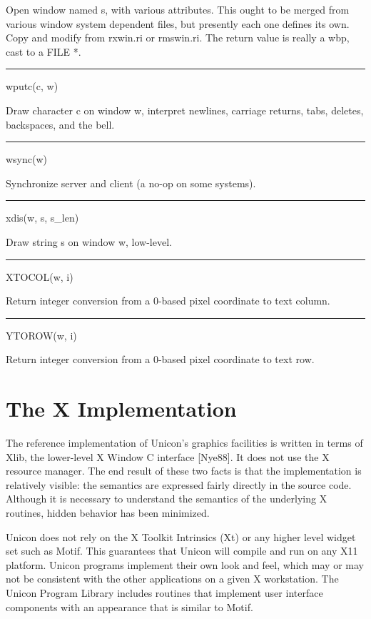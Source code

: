 Open window named s, with various attributes. This ought to be merged
from various window system dependent files, but presently each one
defines its own. Copy and modify from \textsf{rxwin.ri} or
\textsf{rmswin.ri}. The return value is really a \textsf{wbp}, cast to
a \textsf{FILE *}.


\bigskip\hrule\vspace{0.1cm}
\noindent
wputc(c, w)


Draw character \textsf{c} on window \textsf{w}, interpret newlines,
carriage returns, tabs, deletes, backspaces, and the bell.


\bigskip\hrule\vspace{0.1cm}
\noindent
wsync(w)


Synchronize server and client (a no-op on some systems).


\bigskip\hrule\vspace{0.1cm}
\noindent
xdis(w, s, s\_len)


Draw string s on window \textsf{w}, low-level.


\bigskip\hrule\vspace{0.1cm}
\noindent
XTOCOL(w, i)


Return integer conversion from a 0-based pixel coordinate to text column.


\bigskip\hrule\vspace{0.1cm}
\noindent
YTOROW(w, i)


Return integer conversion from a 0-based pixel coordinate to text row.

\section{The X Implementation}

The reference implementation of Unicon's graphics facilities is
written in terms of Xlib, the lower-level X Window C interface
[Nye88]. It does not use the X resource manager. The end result of
these two facts is that the implementation is relatively visible: the
semantics are expressed fairly directly in the source code. Although
it is necessary to understand the semantics of the underlying X
routines, hidden behavior has been minimized.

Unicon does not rely on the X Toolkit Intrinsics (Xt) or any higher
level widget set such as Motif. This guarantees that Unicon will
compile and run on any X11 platform. Unicon programs implement their
own look and feel, which may or may not be consistent with the other
applications on a given X workstation. The Unicon Program Library
includes routines that implement user interface components with an
appearance that is similar to Motif.

